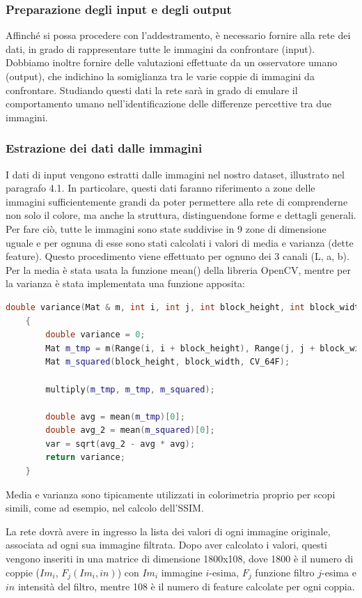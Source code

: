 \documentclass[a4paper,11pt]{article}
\begin{document}
    \subsubsection{Preparazione degli input e degli output}
    Affinché si possa procedere con l'addestramento, è necessario fornire alla rete dei dati, in grado di rappresentare
    tutte le immagini da confrontare (input). Dobbiamo inoltre fornire delle valutazioni effettuate da un osservatore umano (output), che indichino la somiglianza tra le varie coppie di immagini da confrontare. 
    Studiando questi dati la rete sarà in grado di emulare il comportamento umano nell'identificazione delle differenze percettive tra due immagini.

    \subsubsection{Estrazione dei dati dalle immagini}
    I dati di input vengono estratti dalle immagini nel nostro dataset, illustrato nel paragrafo 4.1. In particolare, questi dati faranno riferimento a zone delle immagini sufficientemente grandi da poter permettere alla rete di comprenderne
    non solo il colore, ma anche la struttura, distinguendone forme e dettagli generali. Per fare ciò, tutte le immagini sono
    state suddivise in 9 zone di dimensione uguale e per ognuna di esse sono stati calcolati i valori di media e varianza (dette feature). Questo procedimento
    viene effettuato per ognuno dei 3 canali (L, a, b).
    Per la media è stata usata la funzione mean() della libreria OpenCV, mentre per la varianza è stata implementata una funzione apposita: 
    \begin{lstlisting}[language=C++]
    double variance(Mat & m, int i, int j, int block_height, int block_width)
    {
        double variance = 0;
        Mat m_tmp = m(Range(i, i + block_height), Range(j, j + block_width)); 
        Mat m_squared(block_height, block_width, CV_64F); 
        
        multiply(m_tmp, m_tmp, m_squared);
        
        double avg = mean(m_tmp)[0]; 	
        double avg_2 = mean(m_squared)[0]; 	
        var = sqrt(avg_2 - avg * avg);
        return variance;
    }
    \end{lstlisting}
    Media e varianza sono tipicamente utilizzati in colorimetria proprio per scopi simili, come ad esempio, nel calcolo dell'SSIM.

    La rete dovrà avere in ingresso la lista dei valori di ogni immagine originale, associata ad ogni sua immagine filtrata. 
    Dopo aver calcolato i valori, questi vengono inseriti in una matrice di dimensione 1800x108, dove 1800 è il numero di coppie ($Im_i$, $F_j(Im_i, in)$)
    con $Im_i$ immagine $i$-esima, $F_j$ funzione filtro $j$-esima e $in$ intensità del filtro, mentre 108 è il numero di feature calcolate per ogni coppia.
    
\end{document}

